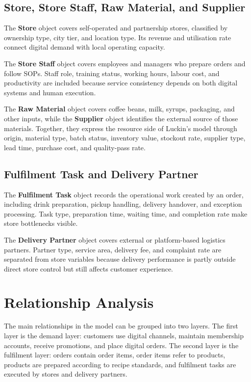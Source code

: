 \documentclass[12pt,a4paper]{article}
\begin{document}
\subsection{Store, Store Staff, Raw Material, and Supplier}

The \textbf{Store} object covers self-operated and partnership stores, classified by ownership type, city tier, and location type. Its revenue and utilisation rate connect digital demand with local operating capacity.

The \textbf{Store Staff} object covers employees and managers who prepare orders and follow SOPs. Staff role, training status, working hours, labour cost, and productivity are included because service consistency depends on both digital systems and human execution.

The \textbf{Raw Material} object covers coffee beans, milk, syrups, packaging, and other inputs, while the \textbf{Supplier} object identifies the external source of those materials. Together, they express the resource side of Luckin's model through origin, material type, batch status, inventory value, stockout rate, supplier type, lead time, purchase cost, and quality-pass rate.

\subsection{Fulfilment Task and Delivery Partner}

The \textbf{Fulfilment Task} object records the operational work created by an order, including drink preparation, pickup handling, delivery handover, and exception processing. Task type, preparation time, waiting time, and completion rate make store bottlenecks visible.

The \textbf{Delivery Partner} object covers external or platform-based logistics partners. Partner type, service area, delivery fee, and complaint rate are separated from store variables because delivery performance is partly outside direct store control but still affects customer experience.

\section{Relationship Analysis}

The main relationships in the model can be grouped into two layers. The first layer is the demand layer: customers use digital channels, maintain membership accounts, receive promotions, and place digital orders. The second layer is the fulfilment layer: orders contain order items, order items refer to products, products are prepared according to recipe standards, and fulfilment tasks are executed by stores and delivery partners.
\end{document}
